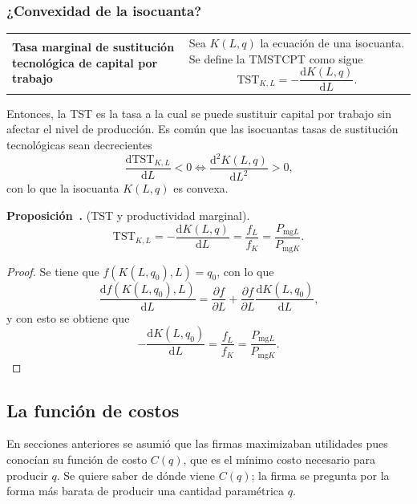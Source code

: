 \documentclass{report}
\newcounter{theorem}[chapter]
\newenvironment{prop}[1]{\refstepcounter{theorem}\noindent\setlength{\parskip}{0pt}\textbf{Proposición~\thechapter.\thetheorem} (#1).}{}
\newenvironment{definition}[1]{\begin{center}
\begin{tabular}{p{3.5cm} p{12.5cm}}
\textbf{#1} &
}
{\\ \end{tabular}\end{center}}
\begin{document}
\subsubsection{¿Convexidad de la isocuanta?}

\begin{definition}{Tasa marginal de sustitución tecnológica de capital por trabajo}
Sea $K\!\left(L,q\right)$ la ecuación de una isocuanta. Se define la TMSTCPT como sigue
\[
\mathrm{TST}_{K,L}=-\frac{\mathrm{d}K\!\left(L,q\right)}{\mathrm{d}L}\text{.}
\]
\end{definition}

Entonces, la TST es la tasa a la cual se puede sustituir capital por trabajo sin afectar el nivel de producción. Es común que las isocuantas tasas de sustitución tecnológicas sean decrecientes
\[
\frac{\mathrm{d}\mathrm{TST}_{K,L}}{\mathrm{d}L}<0\Leftrightarrow\frac{\mathrm{d}^2K\!\left(L,q\right)}{\mathrm{d}L^2}>0\text{,}
\]
con lo que la isocuanta $K\!\left(L,q\right)$ es convexa.

\begin{prop}{TST y productividad marginal}
\[
\mathrm{TST}_{K,L}=-\frac{\mathrm{d}K\!\left(L,q\right)}{\mathrm{d}L}=\frac{f_L}{f_K}=\frac{P_{\text{mg}L}}{P_{\text{mg}K}}\text{.}
\]
\end{prop}

\begin{proof}
Se tiene que $f\!\left(K\!\left(L,q_0\right),L\right)=q_0$, con lo que
\[
\frac{\mathrm{d}f\!\left(K\!\left(L,q_0\right),L\right)}{\mathrm{d}L}=\frac{\partial f}{\partial L}+\frac{\partial f}{\partial L}\frac{\mathrm{d}K\!\left(L,q_0\right)}{\mathrm{d}L}\text{,}
\]
y con esto se obtiene que
\[
-\frac{\mathrm{d}K\!\left(L,q_0\right)}{\mathrm{d}L}=\frac{f_L}{f_K}=\frac{P_{\text{mg}L}}{P_{\text{mg}K}}\text{.}
\]
\end{proof}

\subsection{La función de costos}

En secciones anteriores se asumió que las firmas maximizaban utilidades pues conocían su función de costo $C\!\left(q\right)$, que es el mínimo costo necesario para producir $q$. Se quiere saber de dónde viene $C\!\left(q\right)$; la firma se pregunta por la forma más barata de producir una cantidad paramétrica $q$.
\end{document}
